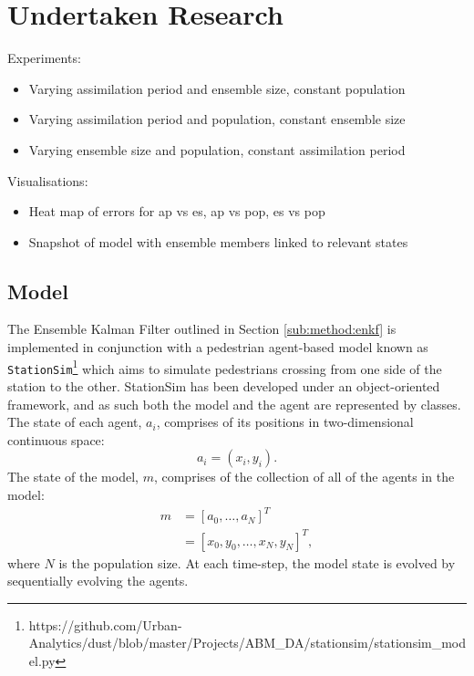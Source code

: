 \section{Undertaken Research}\label{sec:research}

Experiments:
\begin{itemize}
    \item Varying assimilation period and ensemble size, constant population
    \item Varying assimilation period and population, constant ensemble size
    \item Varying ensemble size and population, constant assimilation period
\end{itemize}

Visualisations:
\begin{itemize}
    \item Heat map of errors for ap vs es, ap vs pop, es vs pop
    \item Snapshot of model with ensemble members linked to relevant states
\end{itemize}

\subsection{Model}\label{sub:research:model}

The Ensemble Kalman Filter outlined in Section \ref{sub:method:enkf} is
implemented in conjunction with a pedestrian agent-based model known as
\texttt{StationSim}\footnote{https://github.com/Urban-Analytics/dust/blob/master/Projects/ABM\_DA/stationsim/stationsim\_model.py}
which aims to simulate pedestrians crossing from one side of the station to the
other.
StationSim has been developed under an object-oriented framework, and as such
both the model and the agent are represented by classes.
The state of each agent, $a_i$, comprises of its positions in two-dimensional continuous space:
\begin{equation}
    a_i = \left( x_i , y_i \right).
\end{equation}
The state of the model, $m$, comprises of the collection of all of the agents in the
model:
\begin{align}
    m &= \left[ a_0 , \ldots , a_N \right]^T \nonumber \\
      &= \left[ x_0 , y_0 , \ldots , x_N , y_N \right]^T,
\end{align}
where $N$ is the population size.
At each time-step, the model state is evolved by sequentially evolving the
agents.

